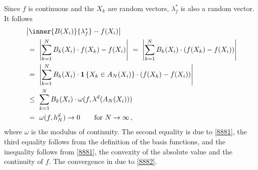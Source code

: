 \begin{example}
Since $f$ is continuous and the $X_k$ are random vectors,
$\lambda^*_f$ is also a random vector.
It follows 
\begin{align*}
  &
        \left| 
        \inner{B(X_i)}{\lambda^*_f}
        -
        f(X_i)
        \right|
        \\
  &
  \ 
        =
  \ 
        \left| 
        \sum_{k=1}^{N} 
        B_k(X_i)
        \cdot
        f(X_k)
        -
        f(X_i)
        \right|
        \ 
        =
        \ 
        \left| 
        \sum_{k=1}^{N} 
        B_k(X_i)
        \cdot
        \left( 
        f(X_k)
        -
        f(X_i)
        \right)
        \right|
\\
  &
  \ 
        =
  \ 
        \left| 
        \sum_{k=1}^{N} 
        B_k(X_i)
        \cdot
        \mathbf{1}
        \left\{ X_k\in A_N(X_i) \right\}
        \cdot
        \left( 
        f(X_k)
        -
        f(X_i)
        \right)
        \right|
        \\
  &
  \ 
        \le
  \ 
        \sum_{k=1}^{N} 
        B_k(X_i)
        \cdot
        \omega
        ( 
        f,
        \lambda^d(A_N(X_i))
        )
        \\
  &
  \ 
        =
  \ 
        \omega
        ( 
        f,
        h_N^d
        )
        \to
        0
        \qquad
        \text{for}
        \ 
        N\to\infty
        \,,
\end{align*}
where $\omega$ is the modulus of continuity.
The second equality is due to \eqref{8881}, the third equality follows from the definition of the basis functions, and 
the inequality follows from \eqref{8881}, the convexity of the absolute value and the continuity of $f$.
The convergence in due to \eqref{8882}.
\end{example}

